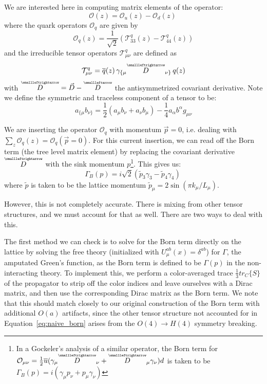 \documentclass[11pt, oneside]{article}   	%
\theoremstyle{definition}
\newcommand{\cev}[1]{\overset{\scriptscriptstyle\smallleftarrow}{#1}}
\newcommand{\cevvec}[1]{\overset{\scriptscriptstyle\smallleftrightarrow}{#1}}
\begin{document}
We are interested here in computing matrix elements of the operator:
\begin{equation}
	\mathcal O(z) = \mathcal O_u(z) - \mathcal O_d(z)~
	\label{eq:operator_dfn}
\end{equation}
where the quark operators $\mathcal O_q$ are given by
\begin{equation}
	\mathcal O_q(z) = \frac{1}{\sqrt{2}}(\mathcal T^q_{33}(z) - \mathcal T^q_{44}(z))
\end{equation}
and the irreducible tensor operators $\mathcal T^q_{\mu\nu}$ are defined as
\begin{equation}
	\mathcal T^q_{\mu\nu} = \overline q(z)\, \gamma_{\{\mu} \cevvec{D}_{\nu\}}\, q(z)
\end{equation}
with $\cevvec D = \vec D - \cev D$ the antisymmetrized covariant derivative. Note we define the symmetric and traceless 
component of a tensor to be:
\begin{equation}
	a_{\{\mu}b_{\nu\}} = \frac{1}{2}(a_\mu b_\nu + a_\nu b_\mu) - \frac{1}{4}a_\alpha b^\alpha g_{\mu\nu}
\end{equation} 

We are inserting the operator $\mathcal O_q$ with momentum $\vec p = 0$, i.e. dealing with $\sum_z \mathcal O_q(z) = 
\mathcal O_q(\vec p = 0)$. For this current insertion, we can read off the Born term (the tree level matrix element) by 
replacing the covariant derivative $\cevvec D$ with the sink momentum $p$\footnote{In a Gockeler's 
analysis of a similar operator, the Born term for $\mathcal O_{\mu\nu} = \frac{1}{2}\overline u (\gamma_\mu \cevvec D_\nu + 
\cevvec D_\mu\gamma_\nu) d$ is taken to be $\Gamma_B(p) = i(\gamma_\mu p_\nu + p_\mu\gamma_\nu)$}. This gives us:
\begin{equation}
	\Gamma_B(p) = i \sqrt{2}(\tilde p_3 \gamma_3 - \tilde p_4\gamma_4)~
	\label{eq:naive_born}
\end{equation}
where $\tilde p$ is taken to be the lattice momentum $\tilde p_\mu = 2\sin(\pi k_\mu / L_\mu)$. 

However, this is not completely accurate. There is mixing from other tensor structures, and we must account for that as well. 
There are two ways to deal with this. 

The first method we can check is to solve for the Born term directly on the lattice by solving the free theory (initialized 
with $U_\mu^{ab}(x) = \delta^{ab}$) for $\Gamma$, the amputated Green's function, as the Born term is defined to be $\Gamma(p)$ 
in the non-interacting theory. To implement this, we perform a color-averaged trace $\frac{1}{3} tr_C\{S\}$ of the propagator to 
strip off the color indices and leave ourselves with a Dirac matrix, and then use the corresponding Dirac matrix as the Born term. 
We note that this should match closely to our original construction of the Born term with additional $O(a)$ artifacts, since the 
other tensor structure not accounted for in Equation~\ref{eq:naive_born} arises from the $O(4)\rightarrow H(4)$ symmetry breaking.
\end{document}
